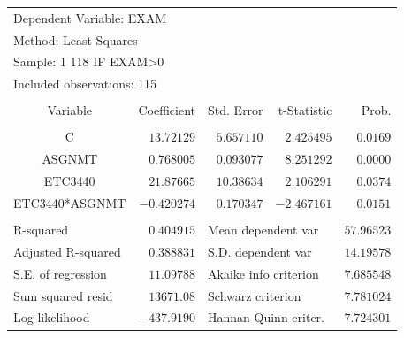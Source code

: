 \documentclass[12pt]{report}
\begin{document}
\begin{table}[H]
	\centering
	\begin{tabular}{lrrrr}
		\multicolumn{3}{l}{Dependent Variable: EXAM}&\multicolumn{1}{c}{}&\multicolumn{1}{c}{}\\
		\multicolumn{3}{l}{Method: Least Squares}&\multicolumn{1}{c}{}&\multicolumn{1}{c}{}\\
		\multicolumn{3}{l}{Sample: 1 118 IF EXAM\textgreater 0}&\multicolumn{1}{c}{}&\multicolumn{1}{c}{}\\
		\multicolumn{3}{l}{Included observations: 115}&\multicolumn{1}{c}{}&\multicolumn{1}{c}{}\\
		[4.5pt] \hline \\ [-4.5pt]
		\multicolumn{1}{c}{Variable}&\multicolumn{1}{r}{Coefficient}&\multicolumn{1}{r}{Std. Error}&\multicolumn{1}{r}{t-Statistic}&\multicolumn{1}{r}{Prob.}\\
		[4.5pt] \hline \\ [-4.5pt]
		\multicolumn{1}{c}{C}&\multicolumn{1}{r}{$13.72129$}&\multicolumn{1}{r}{$5.657110$}&\multicolumn{1}{r}{$2.425495$}&\multicolumn{1}{r}{$0.0169$}\\
		\multicolumn{1}{c}{ASGNMT}&\multicolumn{1}{r}{$0.768005$}&\multicolumn{1}{r}{$0.093077$}&\multicolumn{1}{r}{$8.251292$}&\multicolumn{1}{r}{$0.0000$}\\
		\multicolumn{1}{c}{ETC3440}&\multicolumn{1}{r}{$21.87665$}&\multicolumn{1}{r}{$10.38634$}&\multicolumn{1}{r}{$2.106291$}&\multicolumn{1}{r}{$0.0374$}\\
		\multicolumn{1}{c}{ETC3440*ASGNMT}&\multicolumn{1}{r}{$-0.420274$}&\multicolumn{1}{r}{$0.170347$}&\multicolumn{1}{r}{$-2.467161$}&\multicolumn{1}{r}{$0.0151$}\\
		[4.5pt] \hline \\ [-4.5pt]
		\multicolumn{1}{l}{R-squared}&\multicolumn{1}{r}{$0.404915$}&\multicolumn{2}{l}{Mean dependent var}&\multicolumn{1}{r}{$57.96523$}\\
		\multicolumn{1}{l}{Adjusted R-squared}&\multicolumn{1}{r}{$0.388831$}&\multicolumn{2}{l}{S.D. dependent var}&\multicolumn{1}{r}{$14.19578$}\\
		\multicolumn{1}{l}{S.E. of regression}&\multicolumn{1}{r}{$11.09788$}&\multicolumn{2}{l}{Akaike info criterion}&\multicolumn{1}{r}{$7.685548$}\\
		\multicolumn{1}{l}{Sum squared resid}&\multicolumn{1}{r}{$13671.08$}&\multicolumn{2}{l}{Schwarz criterion}&\multicolumn{1}{r}{$7.781024$}\\
		\multicolumn{1}{l}{Log likelihood}&\multicolumn{1}{r}{$-437.9190$}&\multicolumn{2}{l}{Hannan-Quinn criter.}&\multicolumn{1}{r}{$7.724301$}\\

\end{tabular}
\end{table}
\end{document}
